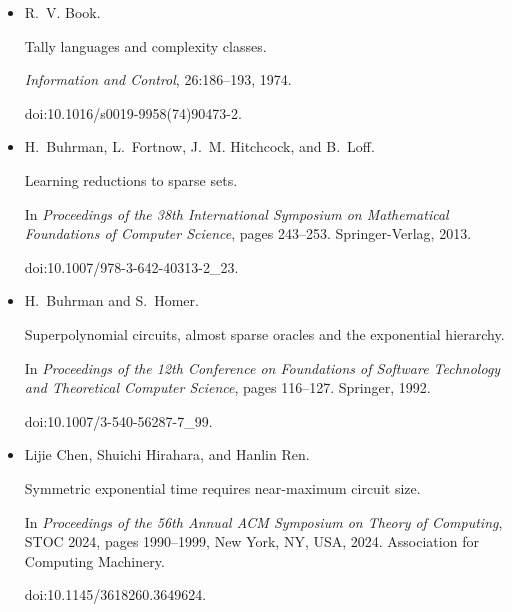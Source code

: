 \begin{itemize}
\emph{SIAM Journal on Computing}, 6(2):305–322, 1977.


doi:10.1137/0206023.





\item[] 
[11]

R. V. Book.


Tally languages and complexity classes.


\emph{Information and Control}, 26:186–193, 1974.


doi:10.1016/s0019-9958(74)90473-2.





\item[] 
[12]

H. Buhrman, L. Fortnow, J. M. Hitchcock, and B. Loff.


Learning reductions to sparse sets.


In \emph{Proceedings of the 38th International Symposium on
Mathematical Foundations of Computer Science}, pages 243–253.
Springer-Verlag, 2013.


doi:10.1007/978-3-642-40313-2\_23.





\item[] 
[13]

H. Buhrman and S. Homer.


Superpolynomial circuits, almost sparse oracles and the exponential
hierarchy.


In \emph{Proceedings of the 12th Conference on Foundations of Software
Technology and Theoretical Computer Science}, pages 116–127. Springer, 1992.


doi:10.1007/3-540-56287-7\_99.





\item[] 
[14]

Lijie Chen, Shuichi Hirahara, and Hanlin Ren.


Symmetric exponential time requires near-maximum circuit size.


In \emph{Proceedings of the 56th Annual ACM Symposium on Theory of
Computing}, STOC 2024, pages 1990–1999, New York, NY, USA, 2024. Association
for Computing Machinery.


doi:10.1145/3618260.3649624.






\end{itemize}
